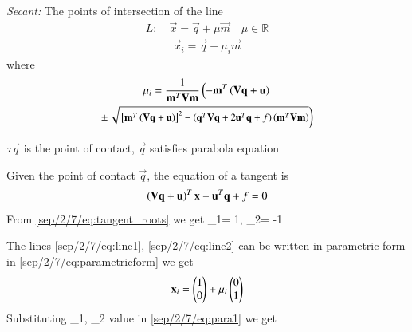 {\em Secant: }The points of intersection of the line 
\begin{align}
L: \quad \vec{x} = \vec{q} + \mu \vec{m} \quad \mu \in \mathbb{R}
\label{sep/2/7/eq:conic_tangent}
\end{align}
\begin{align}\label{sep/2/7/eq:parametricform}
\vec{x}_i = \vec{q} + \mu_i \vec{m}
\end{align}
%
where
\begin{multline}
\mu_i = \frac{1}
{
\mathbf{m}^T\mathbf{V}\mathbf{m}
}
\left(-\mathbf{m}^T\left(\mathbf{V}\mathbf{q}+\mathbf{u}\right)\right.
\\
\pm
{\small
\ensuremath{\left.\sqrt{
{}\left[
\mathbf{m}^T\left(\mathbf{V}\mathbf{q}+\mathbf{u}\right)
\right]^2
-
\left(
\mathbf{q}^T\mathbf{V}\mathbf{q} + 2\mathbf{u}^T\mathbf{q} +f
\right)
\left(\mathbf{m}^T\mathbf{V}\mathbf{m}\right)
}
\right)}
}
\label{sep/2/7/eq:tangent_roots}
\end{multline}
                    
$\because \vec{q}$ is the point of contact, $\vec{q}$ satisfies parabola equation

 
Given the point of contact $\vec{q}$, the equation of a tangent is 
\begin{align}
\left(\mathbf{V}\mathbf{q}+\mathbf{u}\right)^T\mathbf{x}+\mathbf{u}^T\mathbf{q}+f = 0
\label{sep/2/7/eq:conic_tangent_final}
\end{align}
%
From \eqref{sep/2/7/eq:tangent_roots} we get 
\mu_1= 1, \mu_2= -1

The lines \eqref{sep/2/7/eq:line1}, \eqref{sep/2/7/eq:line2} can be written in parametric form in \eqref{sep/2/7/eq:parametricform} we get
\begin{align}\label{sep/2/7/eq:para1}
\mathbf{x}_i = \begin{pmatrix} 1\\ 0\end{pmatrix} + \mu_i \begin{pmatrix}0\\1\end{pmatrix}
\end{align}
Substituting \mu_1, \mu_2 value in \eqref{sep/2/7/eq:para1} we get

